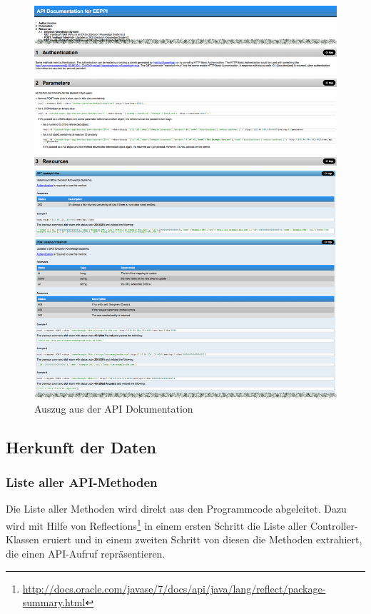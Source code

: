 	\begin{figure}[H]
		\includegraphics[width=\textwidth]{interfacesAndProtocols/media/img/apiDocumentation.png}
		\centering
		\caption{Auszug aus der API Dokumentation}
		\label{fig:apiScreenshot}
	\end{figure}

	\subsection{Herkunft der Daten}
		\subsubsection{Liste aller API-Methoden}
			Die Liste aller Methoden wird direkt aus den Programmcode abgeleitet.
			Dazu wird mit Hilfe von Reflections\footnote{\url{http://docs.oracle.com/javase/7/docs/api/java/lang/reflect/package-summary.html}} in einem ersten Schritt die Liste aller Controller-Klassen eruiert
			und in einem zweiten Schritt von diesen die Methoden extrahiert, die einen API-Aufruf repräsentieren.
		
